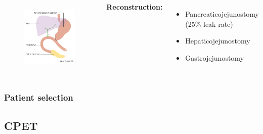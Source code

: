 \documentclass{beamer}
\begin{document}
\begin{frame}
\begin{columns}[t]
		
		\begin{figure}
			\centering
			\includegraphics[width=0.8\linewidth]{whipple_schematic_post}
			\label{fig:whipple_schematic_post}
		\end{figure}
		{\scriptsize
		\textbf{Reconstruction:}
		\begin{itemize}
			\item Pancreaticojejunostomy (25\% leak rate)
			\item Hepaticojejunostomy
			\item Gastrojejunostomy
		\end{itemize}
		}
	\end{columns}
\end{frame}

\begin{frame}
	\frametitle{Patient selection}
	 
	
\end{frame}

\subsection{CPET}
\end{document}
